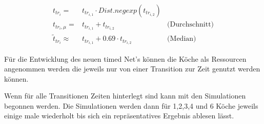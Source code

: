 \begin{eqnarray}
	t_{tr_i}  = & t_{tr_{i,1}} \cdot Dist.negexp(t_{tr_{i,2}}) & \\
	t_{tr_i,\mu}  = & t_{tr_{i,1}} +t_{tr_{i,2}}  & \textrm{(Durchschnitt)}\\
	\widetilde{t}_{tr_i}  \approx & t_{tr_{i,1}} + 0.69 \cdot t_{tr_{i,2}} & \textrm{(Median)}
\end{eqnarray}



Für die Entwicklung des neuen timed Net's können die Köche als Ressourcen angenommen werden die jeweils nur von einer Transition zur Zeit genutzt werden können. 

Wenn für alle Transitionen Zeiten hinterlegt sind kann mit den Simulationen begonnen werden. Die Simulationen werden dann für 1,2,3,4 und 6 Köche jeweils einige male wiederholt bis sich ein repräsentatives Ergebnis ablesen lässt.












